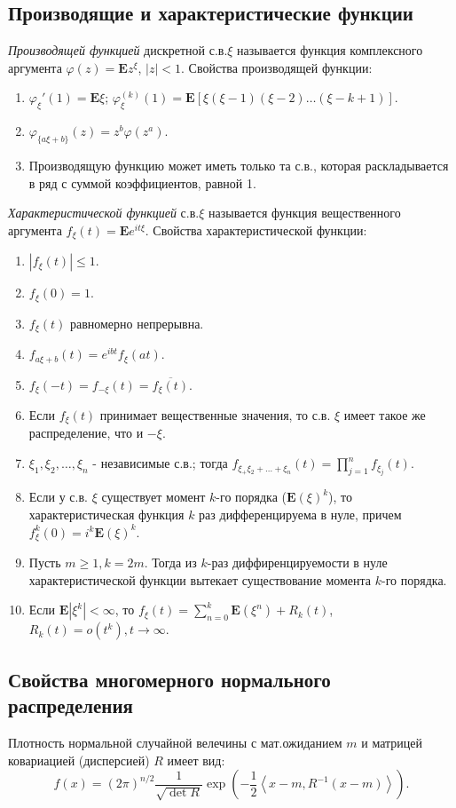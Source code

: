 \documentclass[a4paper,12pt]{scrartcl}
\newcommand{\E}{\mathbf{E}}
\newcommand{\scalar}[2]{\left<#1,#2\right>}
\begin{document}
\subsection{Производящие и характеристические функции}
\emph{Производящей функцией} дискретной с.в.$\xi$ называется функция комплексного аргумента $\varphi(z) = \E z^\xi$, $|z| < 1$. Свойства производящей функции:
\begin{enumerate}
 \item $\varphi_\xi'(1) = \E\xi$; $\varphi_\xi^{(k)}(1) = \E[\xi(\xi-1)(\xi-2)\ldots(\xi-k+1)].$
 \item $\varphi_{\{a\xi+b\}}(z) = z^b\varphi(z^a).$
 \item Производящую функцию может иметь только та с.в., которая раскладывается в ряд с суммой коэффициентов, равной 1.
\end{enumerate}

\emph{Характеристической функцией} с.в.$\xi$ называется функция вещественного аргумента $f_\xi(t) =\E e^{it\xi}$. Свойства характеристической функции:
\begin{enumerate}
\item $|f_\xi(t)| \leqslant 1$.
\item $f_\xi(0) = 1$.
\item $f_\xi(t)$ равномерно непрерывна.
\item $f_{a\xi+b}(t)=e^{ibt}f_\xi(at)$.
\item $f_\xi(-t) = f_{-\xi}(t) = \overline{f_\xi(t)}$.
\item Если $f_\xi(t)$ принимает вещественные значения, то с.в. $\xi$ имеет такое же распределение, что и $-\xi$.
\item $\xi_1,\xi_2,\ldots,\xi_n$ - независимые с.в.; тогда $f_{\xi_+\xi_2+\ldots+\xi_n}(t) = \prod\limits_{j=1}^{n}f_{\xi_j}(t)$.
\item Если у с.в. $\xi$ существует момент $k$-го порядка ($\E(\xi)^k$), то характеристическая функция $k$ раз дифференцируема в нуле, причем $f_\xi^k(0)=i^k\E(\xi)^k$.
\item Пусть $m \geqslant 1, k = 2m$. Тогда из $k$-раз диффиренцируемости в нуле характеристической функции  вытекает существование момента $k$-го порядка.
\item Если $\E|\xi^k| < \infty$, то $f_\xi(t) = \sum\limits_{n=0}^{k}\E(\xi^n) + R_k(t)$, $R_k(t) = o(t^k), t\to\infty$.
\end{enumerate}
\subsection{Свойства многомерного нормального распределения}
Плотность нормальной случайной велечины с мат.ожиданием $m$ и матрицей ковариацией (дисперсией) $R$ имеет вид:
$$
f(x) = (2\pi)^{n/2}\dfrac{1}{\sqrt{\det R}}\exp\left(-\dfrac{1}{2}\scalar{x-m}{R^{-1}(x-m)}\right).
$$
\end{document}
